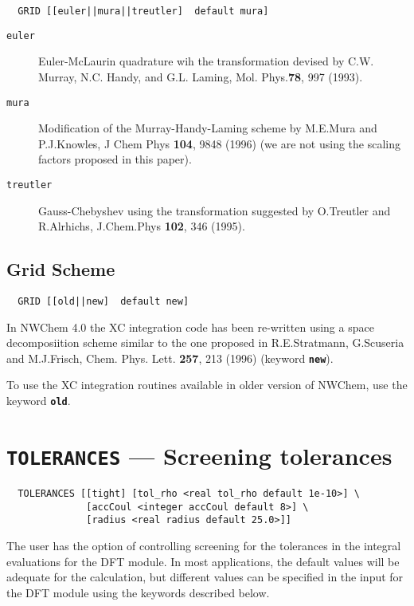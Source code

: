 \begin{verbatim}
  GRID [[euler||mura||treutler]  default mura]
\end{verbatim}

\begin{description}
\item[\tt euler] Euler-McLaurin quadrature wih the transformation
  devised by
C.W. Murray, N.C. Handy, and G.L. Laming,
Mol. Phys.{\bf 78}, 997 (1993).
 \\
\item[\tt mura] Modification of the Murray-Handy-Laming scheme by 
M.E.Mura and P.J.Knowles, J Chem Phys {\bf 104}, 9848
(1996) (we are not using the scaling factors proposed
in this paper).\\
\item[\tt treutler] Gauss-Chebyshev using the transformation suggested
  by O.Treutler and R.Alrhichs, J.Chem.Phys {\bf 102}, 346 (1995).\\
\end{description}

\subsection{Grid Scheme}

\begin{verbatim}
  GRID [[old||new]  default new]
\end{verbatim}

In NWChem 4.0 the XC integration code has been re-written using a
space decomposiition scheme similar to the one proposed in R.E.Stratmann, G.Scuseria and  M.J.Frisch,
Chem. Phys. Lett. {\bf 257}, 213 (1996) (keyword
{\bf \tt new}). 

To use the XC integration routines available in
older version of NWChem, use the keyword {\bf \tt old}.


\section{{\tt TOLERANCES} --- Screening tolerances}

\begin{verbatim}
  TOLERANCES [[tight] [tol_rho <real tol_rho default 1e-10>] \
              [accCoul <integer accCoul default 8>] \
              [radius <real radius default 25.0>]]
\end{verbatim}
%
%
The user has the option of controlling screening for the tolerances in
the integral evaluations for the DFT module.  In most applications,
the default values will be adequate for the calculation, but different
values can be specified in the input for the DFT module using the
keywords described below.

